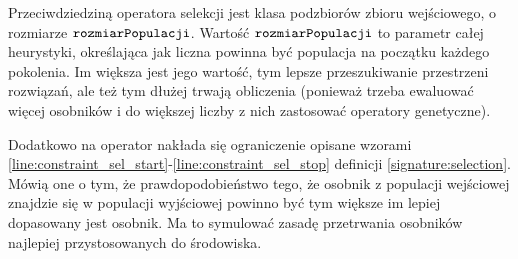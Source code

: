 \documentclass[./FM_mgr.tex]{subfiles}
\begin{document}
Przeciwdziedziną operatora selekcji jest klasa podzbiorów zbioru wejściowego, o rozmiarze $\mathtt{rozmiarPopulacji}$.
Wartość $\mathtt{rozmiarPopulacji}$ to parametr całej heurystyki, określająca jak liczna powinna być populacja na początku każdego pokolenia. 
Im większa jest jego wartość, tym lepsze przeszukiwanie przestrzeni rozwiązań, ale też tym dłużej trwają obliczenia (ponieważ trzeba ewaluować więcej osobników i do większej liczby z nich zastosować operatory genetyczne). 

Dodatkowo na operator nakłada się ograniczenie opisane wzorami \ref{line:constraint_sel_start}-\ref{line:constraint_sel_stop} definicji \ref{signature:selection}. 
Mówią one o tym, że prawdopodobieństwo tego, że osobnik z populacji wejściowej znajdzie się w populacji wyjściowej powinno być tym większe im lepiej dopasowany jest osobnik. 
Ma to symulować zasadę przetrwania osobników najlepiej przystosowanych do środowiska.
\end{document}
